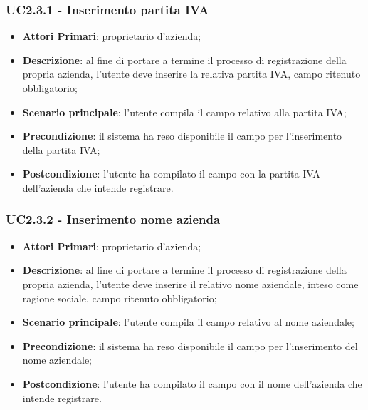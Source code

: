 \subsubsection{UC2.3.1 - Inserimento partita IVA}
\begin{itemize}
	\item \textbf{Attori Primari}: proprietario d'azienda;
	\item \textbf{Descrizione}: al fine di portare a termine il processo di registrazione della propria azienda, l'utente deve inserire la relativa partita IVA, campo ritenuto obbligatorio;
	\item \textbf{Scenario principale}: l'utente compila il campo relativo alla partita IVA;
	\item \textbf{Precondizione}: il sistema ha reso disponibile il campo per l'inserimento della partita IVA;
	\item \textbf{Postcondizione}: l'utente ha compilato il campo con la partita IVA dell'azienda che intende registrare.
\end{itemize}
\subsubsection{UC2.3.2 - Inserimento nome azienda}
\begin{itemize}
	\item \textbf{Attori Primari}: proprietario d'azienda;
	\item \textbf{Descrizione}: al fine di portare a termine il processo di registrazione della propria azienda, l'utente deve inserire il relativo nome aziendale, inteso come ragione sociale, campo ritenuto obbligatorio;
	\item \textbf{Scenario principale}: l'utente compila il campo relativo al nome aziendale;
	\item \textbf{Precondizione}: il sistema ha reso disponibile il campo per l'inserimento del nome aziendale;
	\item \textbf{Postcondizione}: l'utente ha compilato il campo con il nome dell'azienda che intende registrare.
\end{itemize}

